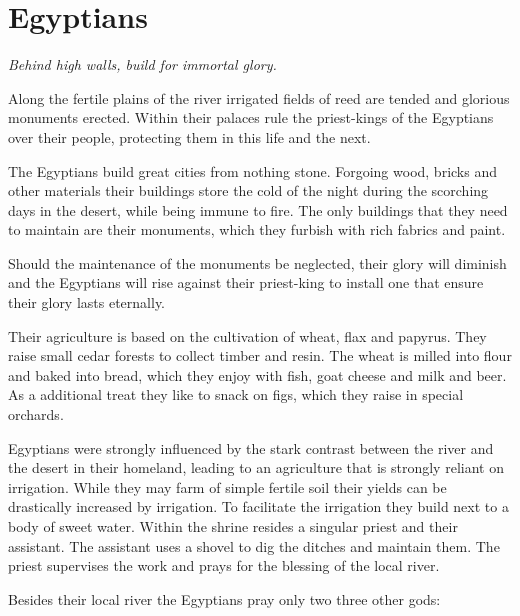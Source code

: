 \section{\Gls{Egyptians}}

\begin{flushright}
	\emph{Behind high walls, build for immortal glory.}
\end{flushright}

Along the fertile plains of the river irrigated fields of reed are tended and
glorious monuments erected. Within their palaces rule the priest-kings of the
\gls{Egyptians} over their people, protecting them in this life and the next.

The \gls{Egyptians} build great cities from nothing stone. Forgoing wood,
bricks and other materials their buildings store the cold of the night during
the scorching days in the desert, while being immune to fire. The only
buildings that they need to maintain are their monuments, which they furbish
with rich fabrics and paint.

Should the maintenance of the monuments be neglected, their glory will diminish
and the \gls{Egyptians} will rise against their priest-king to install one that
ensure their glory lasts eternally.

Their agriculture is based on the cultivation of wheat, flax and papyrus. They
raise small cedar forests to collect timber and resin. The wheat is milled into
flour and baked into bread, which they enjoy with fish, goat cheese and milk
and beer. As a additional treat they like to snack on figs, which they raise in
special orchards.

\Gls{Egyptians} were strongly influenced by the stark contrast between
the river and the desert in their homeland,
leading to an agriculture that is strongly reliant on irrigation.
While they may farm of simple fertile soil their yields can be drastically
increased by irrigation.
To facilitate the irrigation they build  next to a body of sweet water.
Within the shrine resides a singular priest and their assistant.
The assistant uses a shovel to dig the ditches and maintain them.
The priest supervises the work and prays for the blessing of the local river.

Besides their local river the \gls{Egyptians} pray only two three other gods:

